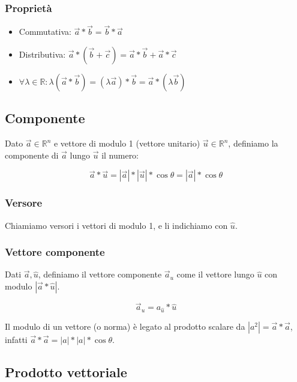 \documentclass{subfiles}
\begin{document}
\subsubsection{Proprietà}

\begin{itemize}
    \item Commutativa: $\vec{a} * \vec{b} = \vec{b} * \vec{a}$
    \item Distributiva: $\vec{a} * (\vec{b}+\vec{c}) = \vec{a}*\vec{b} + \vec{a}*\vec{c}$
    \item $\forall \lambda \in \mathbb{R} : \lambda (\vec{a} * \vec{b}) = (\lambda\vec{a}) * \vec{b} = \vec{a} * (\lambda\vec{b})$
\end{itemize}

\subsection{Componente}

Dato $\vec{a} \in \mathbb{R}^n$ e vettore di modulo 1 (vettore unitario)  $\vec{u} \in \mathbb{R}^n$, definiamo la componente di $\vec{a}$ lungo $\vec{u}$ il numero:

$$
\vec{a} * \vec{u} = |\vec{a}| * |\vec{u}| * \cos{\theta} = |\vec{a}| * \cos{\theta}
$$

\subsubsection{Versore}

Chiamiamo versori i vettori di modulo 1, e li indichiamo con $\hat{u}$.

\subsubsection{Vettore componente}

Dati $\vec{a}, \hat{u}$, definiamo il vettore componente $\vec{a}_u$ come il vettore lungo $\hat{u}$ con modulo $|\vec{a} * \hat{u}|$.

$$
\vec{a}_u = a_{\hat{u}} * \hat{u}
$$

\noindent
Il modulo di un vettore (o norma) è legato al prodotto scalare da $|a^2| = \vec{a} * \vec{a}$, infatti $\vec{a} * \vec{a} = |a| * |a| * \cos{\theta}$.

\subsection{Prodotto vettoriale}
\end{document}
